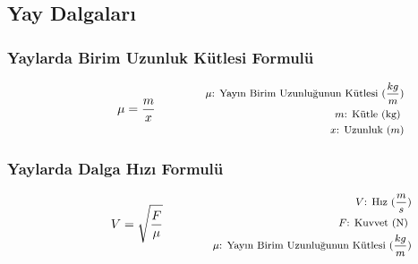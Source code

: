 \subsection{Yay Dalgaları}

\subsubsection*{Yaylarda Birim Uzunluk Kütlesi Formulü}
\begin{equation}
    \mu = \frac{m}{x} \qquad \qquad \parbox{4cm}{\footnotesize$\begin{aligned}
        \mu\text{: Yayın Birim Uzunluğunun Kütlesi } (\frac{kg}{m}) \\
        m\text{: Kütle (kg) } \\
        x\text{: Uzunluk } (m)
\end{aligned}$}
\end{equation}

\subsubsection*{Yaylarda Dalga Hızı Formulü}
\begin{equation}
    V = \sqrt{\frac{F}{\mu}} \qquad \qquad \parbox{4cm}{\footnotesize$\begin{aligned}
        V\text{: Hız } (\frac{m}{s}) \\
        F\text{: Kuvvet (N) } \\
        \mu\text{: Yayın Birim Uzunluğunun Kütlesi } (\frac{kg}{m}) 
\end{aligned}$}
\end{equation}
